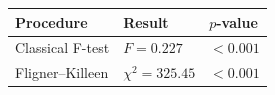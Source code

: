 \begin{tabular}{lll}
\toprule
Procedure & Result & $p$-value
\\
\midrule
Classical F-test & $F = 0.227$ & $<0.001$
\\
Fligner--Killeen & $\chi^2 = 325.45$ & $<0.001$
\\
\bottomrule
\end{tabular}
